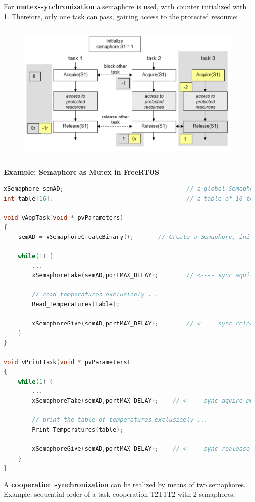 For \textbf{mutex-synchronization} a semaphore is used, with counter initialized with 1. Therefore, only one task can pass, gaining access to the protected resource: 

 	\begin{figure}[h]
    \centering
    \includegraphics[width=14cm, height=7cm]{Images/image106.png}
    \label{fig:Fig 52}
    \end{figure}


\textbf{Example: Semaphore as Mutex in FreeRTOS}

\begin{lstlisting}[style=mystyle, language=c]
xSemaphore semAD;									// a global Semaphore
int table[16];										// a table of 16 temperatures

void vAppTask(void * pvParameters)
{
	semAD = vSemaphoreCreateBinary();		// Create a Semaphore, initially 1 

	while(1) {
		...
		xSemaphoreTake(semAD,portMAX_DELAY);		// <---- sync aquire mutex
		
		// read temperatures exclusicely ...
		Read_Temperatures(table);

		xSemaphoreGive(semAD,portMAX_DELAY);		// <---- sync release the mutex
 	}
}

void vPrintTask(void * pvParameters)
{
	while(1) {
		...
		xSemaphoreTake(semAD,portMAX_DELAY);	// <---- sync aquire mutex
		
		// print the table of temperatures exclusicely ...
		Print_Temperatures(table);

		xSemaphoreGive(semAD,portMAX_DELAY);	// <---- sync realease the mutex !
 	}
}
\end{lstlisting}

A \textbf{cooperation synchronization} can be realized by means of two semaphores. Example: sequential order of a task cooperation T2T1T2 with 2 semaphores:

